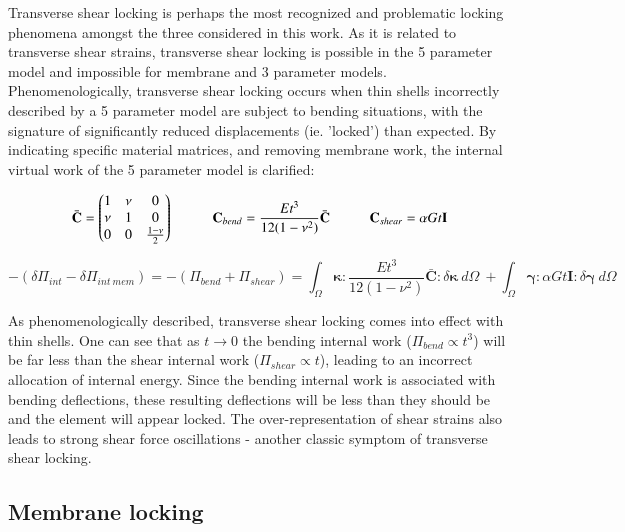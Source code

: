 Transverse shear locking is perhaps the most recognized and problematic locking phenomena amongst the three considered in this work. As it is related to transverse shear strains, transverse shear locking is possible  in the 5 parameter model and impossible for membrane and 3 parameter models. Phenomenologically, transverse shear locking occurs when thin shells incorrectly described by a 5 parameter model are subject to bending situations, with the signature of significantly reduced displacements (ie. 'locked') than expected. By indicating specific material matrices, and removing membrane work, the internal virtual work of the 5 parameter model is clarified: 

\singlespacing
\begin{equation} 
\bar{\mathbf{C}} =
\begin{pmatrix}
1 & \nu & 0 \\
\nu & 1 & 0 \\
0 & 0 & \frac{1-\nu}{2}
\end{pmatrix}
\hspace{10mm}
\mathbf{C}_{bend} = \frac{E t^3}{12(1-\nu^2)} \bar{ \mathbf{C}}
\hspace{10mm}
\mathbf{C}_{shear} = \alpha G t \mathbf{I}
\label{eqlock1}
\end{equation}

\begin{equation} 
-( \delta\Pi_{int} - \delta\Pi_{int\ mem} )=
-(\Pi_{bend} + \Pi_{shear}) =
\int_\Omega
\boldsymbol{\kappa}
:
\frac{E t^3}{12(1-\nu^2)} \bar{ \mathbf{C}}
:
\delta \boldsymbol{\kappa}\ 
d \Omega\ 
+
\int_\Omega
\boldsymbol{\gamma}
:
\alpha G t \mathbf{I}
:
\delta \boldsymbol{\gamma}\ 
d \Omega
\label{eqlock2}
\end{equation}

\doublespacing

As phenomenologically described, transverse shear locking comes into effect with thin shells. One can see that as $t \rightarrow 0$ the bending internal work ($\Pi_{bend} \propto t^3$) will be far less than the shear internal work ($\Pi_{shear} \propto t$), leading to an incorrect allocation of internal energy. Since the bending internal work is associated with bending deflections, these resulting deflections will be less than they should be and the element will appear locked. The over-representation of shear strains also leads to strong shear force oscillations - another classic symptom of transverse shear locking.


\subsection{Membrane locking}

